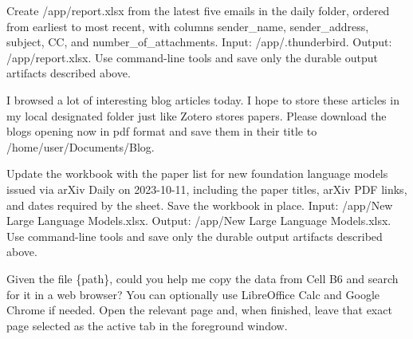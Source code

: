 \documentclass{llmxive}
\begin{document}
\begin{instructionbox}
Create \textasciigrave{}/app/report.xlsx\textasciigrave{} from the latest five emails in the \textasciigrave{}daily\textasciigrave{} folder, ordered from earliest to most recent, with columns \textasciigrave{}sender\_name\textasciigrave{}, \textasciigrave{}sender\_address\textasciigrave{}, \textasciigrave{}subject\textasciigrave{}, \textasciigrave{}CC\textasciigrave{}, and \textasciigrave{}number\_of\_attachments\textasciigrave{}.
Input: \textasciigrave{}/app/.thunderbird\textasciigrave{}.
Output: \textasciigrave{}/app/report.xlsx\textasciigrave{}.
Use command-line tools and save only the durable output artifacts described above.
\end{instructionbox}

\begin{instructionbox}
I browsed a lot of interesting blog articles today. I hope to store these articles in my local designated folder just like Zotero stores papers. Please download the blogs opening now in pdf format and save them in their title to \textasciigrave{}/home/user/Documents/Blog\textasciigrave{}.
\end{instructionbox}

\begin{instructionbox}
Update the workbook with the paper list for new foundation language models issued via arXiv Daily on 2023-10-11, including the paper titles, arXiv PDF links, and dates required by the sheet. Save the workbook in place.
Input: \textasciigrave{}/app/New Large Language Models.xlsx\textasciigrave{}.
Output: \textasciigrave{}/app/New Large Language Models.xlsx\textasciigrave{}.
Use command-line tools and save only the durable output artifacts described above.
\end{instructionbox}

\begin{instructionbox}
Given the file \{path\}, could you help me copy the data from Cell B6 and search for it in a web browser? You can optionally use LibreOffice Calc and Google Chrome if needed. Open the relevant page and, when finished, leave that exact page selected as the active tab in the foreground window.
\end{instructionbox}
\end{document}
